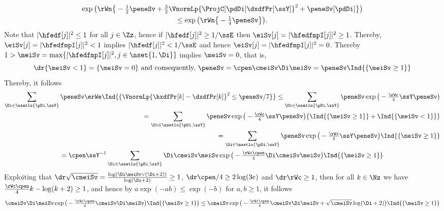 \begin{pro}
\begin{multline*}
   \exp\big(\rWn\big\{-\tfrac{1}{2}\peneSv+\tfrac{3}{2}\VnormLp{\ProjC[\pdDi]\dxdfPr[\ssY]}^2+\peneSv[\pdDi]\big\}\big)
    \\
    \leq \exp\big(\rWn\big\{-\tfrac{1}{4} \peneSv\big\}\big).
  \end{multline*}
Note that $|\hfedf[j]|^2\leq1$ for all $j\in\Zz$, hence if
$|\hfedf[j]|^2\geq1/\ssE$ then $\eiSv[j]=|\hfedfmpI[j]|^2\geq1$. Thereby,
$\eiSv[j]=|\hfedfmpI[j]|^2<1$ implies $|\hfedf[j]|^2<1/\ssE$ and hence
$\eiSv[j]=|\hfedfmpI[j]|^2=0$. Thereby
$1>\meiSv=\max\{|\hfedfmpI[j]|^2,j\in\nset{1,\Di}\}$ implies
$\meiSv=0$, that is,
\begin{equation}\label{p:au:re:SrWe:ag:hPhi}
{\dr\{\meiSv<1\}=\{\meiSv=0\}}\text{ and consequently, }\peneSv=\cpen\cmeiSv \Di \meiSv=\peneSv\Ind{\{\meiSv\geq1\}}
\end{equation}
Thereby, it   follows 
  \begin{multline}\label{p:au:re:SrWe:ag:e1}
\sum_{\Di\in\nsetlo{\pDi,\ssY}}\peneSv\erWe\Ind{\{\VnormLp{\hxdfPr[k]-\dxdfPr[k]}^2\leq\peneSv/7\}}
\leq \sum_{\Di\in\nsetlo{\pDi,\ssY}}\peneSv\exp\big(-\tfrac{\rWc}{4}\ssY\peneSv\big)
\\\hfill=\sum_{\Di\in\nsetlo{\pDi,\ssY}}\peneSv\exp\big(-\tfrac{\rWc}{4}\ssY\peneSv\big)\{\Ind{\{\meiSv\geq1\}}+\Ind{\{\meiSv<1\}}\}\\
\hfill=\sum_{\Di\in\nsetlo{\pDi,\ssY}}\peneSv\exp\big(-\tfrac{\rWc}{4}\ssY\peneSv\big)\Ind{\{\meiSv\geq1\}}\\
=\cpen\ssY^{-1}\sum_{\Di\in\nsetlo{\pDi,\ssY}} \Di\cmeiSv\meiSv\exp\big(-\tfrac{\rWc\cpen}{4}\Di\cmeiSv\meiSv\big)\Ind{\{\meiSv\geq1\}}
  \end{multline}
  Exploiting that
  $\dr\sqrt{\cmeiSv}=\tfrac{\log (\Di\meiSv \vee
    (\Di+2))}{\log(\Di+2)}\geq1$, $\dr\cpen/4\geq2\log(3e)$ and
  $\dr\rWc\geq1$, then for all $k\in\Nz$ we have
  $\tfrac{\rWc\cpen}{4} k-\log(k+2)\geq1$, and hence by
  $a\exp(-ab)\leq \exp(-b)$ for $a,b\geq1$, it follows
  \begin{multline}\label{p:au:re:SrWe:ag:e2}
    \cmeiSv\Di \meiSv\exp\big(-\tfrac{\rWc\cpen}{4}\cmeiSv\Di\meiSv\big)\Ind{\{\meiSv\geq1\}}
    \leq\cmeiSv\exp\big(-\tfrac{\rWc\cpen}{4}\cmeiSv\Di\meiSv + \sqrt{\cmeiSv}\log(\Di+2)\big)\Ind{\{\meiSv\geq1\}}

\end{multline}
\end{pro}
